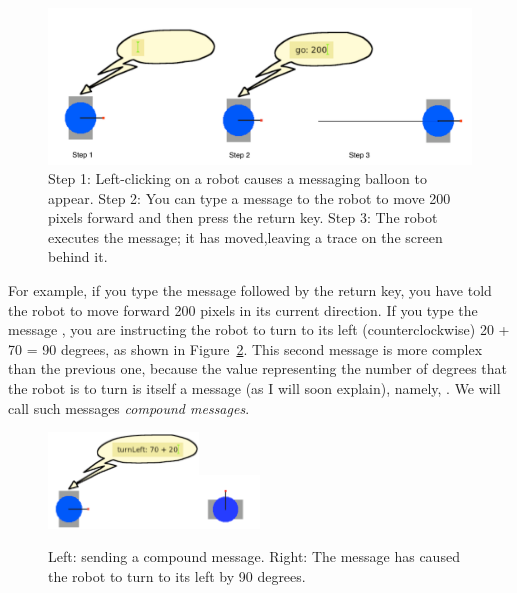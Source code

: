 \documentclass[a4paper,10pt,twoside]{book}
\begin{document}
\begin{figure}[h]\centerline{\includegraphics[width=\linewidth]{9-sendingAMsg2}}
\caption{Step 1: Left-clicking on a robot causes a messaging balloon to appear. 
Step 2: You can type a message to the robot to move 200 pixels forward and then press the return 
key. Step 3: The robot executes the message; it has moved,leaving a trace on the screen behind it.\label{fig:go}}
\end{figure}

For example, if you type the message  followed by the return key, you have told the robot 
to move forward 200 pixels in its current direction. If you type the message , 
you are instructing the robot to turn to its left (counterclockwise) 20 + 70 = 90 degrees, as shown 
in Figure~\ref{fig:turned}. This second message is more complex than the previous one, because the value 
representing the number of degrees that the robot is to turn is itself a message (as I will soon 
explain), namely, . We will call such messages \emph{compound messages}. 


\begin{figure}[h]\begin{center}{\hfill\includegraphics[width=4cm]{10-turn20+702}\hfill\includegraphics[width=1.6cm]{11-turned2}\hfill}\end{center}
\caption{Left: sending a compound message. Right: The message has caused the robot to turn to its left by 90 degrees.\label{fig:turned}}
\end{figure}
\end{document}

